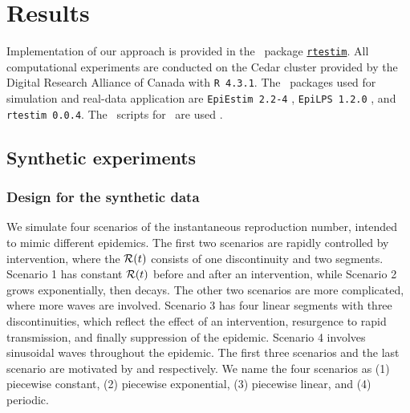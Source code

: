 \section{Results}

Implementation of our approach is provided in the \R\ package
\href{https://dajmcdon.github.io/rtestim/}{\texttt{rtestim}}. All computational
experiments are conducted on the Cedar cluster provided by the Digital Research
Alliance of Canada with \texttt{R 4.3.1}. The \R\ packages used for simulation
and real-data application are \texttt{EpiEstim 2.2-4} \citep{Cori2022},
\texttt{EpiLPS 1.2.0} \citep{Gressani2021}, and \texttt{rtestim 0.0.4}. The \R\
scripts for \EpiFilter\ are used \citep{kpzoo2020}.

\subsection{Synthetic experiments}

\subsubsection{Design for the synthetic data}

We simulate four scenarios of the instantaneous reproduction number, intended to
mimic different epidemics. The first two scenarios are rapidly controlled by
intervention, where the $\mathcal{R}(t)$ consists of one discontinuity and two
segments. Scenario 1 has constant $\mathcal{R}(t)$ before and after an intervention,
while Scenario 2 grows exponentially, then decays. The other two scenarios are
more complicated, where more waves are involved. Scenario 3 has four linear
segments with three discontinuities, which reflect the effect of an
intervention, resurgence to rapid transmission, and finally suppression of the
epidemic. Scenario 4 involves sinusoidal waves throughout the epidemic. The
first three scenarios and the last scenario are motivated by
\cite{parag2021improved} and \cite{gressani2022epilps} respectively. We name the
four scenarios as (1) piecewise constant, (2) piecewise
exponential, (3) piecewise linear, and (4) periodic.

